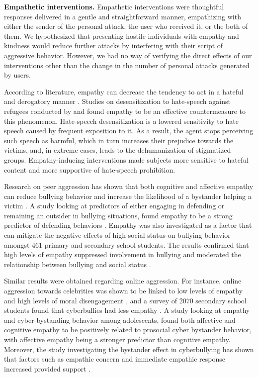 \documentclass[preprint,12pt]{elsarticle}
\begin{document}
\textbf{Empathetic interventions.} Empathetic interventions were thoughtful responses delivered in a gentle and straightforward manner,  empathizing with either the sender of the personal attack, the user who received it, or the both of them.  We hypothesized that presenting hostile individuals with empathy and kindness would reduce further attacks by interfering with their script of aggressive behavior. However, we had no way of verifying the direct effects of our interventions other than the change in the number of personal attacks generated by users.  

According to literature, empathy can decrease the tendency to act in a hateful and derogatory manner 
\citep{zaki2014empathy}. Studies on desensitization to hate-speech against refugees conducted by \citet{bilewicz2016psychological} and \citet{soral2022role} found empathy to be an effective countermeasure to this phenomenon. Hate-speech desensitization is a lowered sensitivity to hate speech caused by frequent exposition to it.  As a result, the agent stops perceiving such speech as harmful, which in turn increases their prejudice towards the victims, and, in extreme cases, leads to the dehumanization of stigmatized groups.  Empathy-inducing interventions made subjects more sensitive to hateful content and more supportive of hate-speech prohibition.



Research on peer aggression has shown that both cognitive and affective empathy can reduce bullying behavior and increase the likelihood of a bystander helping a victim \citep{van2015empathy}. A study looking at predictors of either engaging in defending or remaining an outsider in bullying situations, found empathy to be a strong predictor of defending behaviors \citep{nickerson2008attachment}. Empathy was also investigated as a factor that can mitigate the negative effects of high social status on bullying behavior amongst 461 primary and secondary school students. The results confirmed that high levels of empathy suppressed involvement in bullying and moderated the relationship between bullying and social status
 \citep{caravita2009unique}. 

Similar results were obtained regarding online aggression. For instance, online aggression towards celebrities was shown to be linked to low levels of empathy and high levels of moral disengagement 
\citep{ouvrein2018online}, and a survey of 2070 secondary school students found that cyberbullies had less empathy \citep{steffgen2011cyberbullies}. 
A study \citep{barlinska2018cyberbullying} looking at empathy and cyber-bystanding behavior among adolescents, found both affective and cognitive empathy to be positively related to prosocial cyber bystander behavior, with affective empathy being a stronger predictor than cognitive empathy. Moreover, the study investigating the bystander effect in cyberbullying has shown that factors such as empathic concern and immediate empathic response increased provided
 support \citep{machackova2015brief}. 
\end{document}
